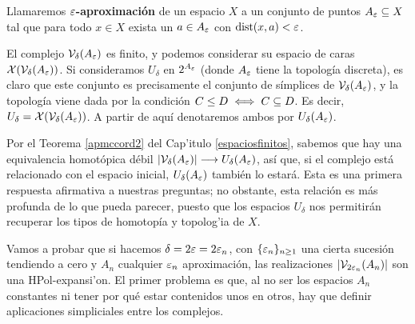 \begin{definition}
  Llamaremos $ \varepsilon $\textbf{-aproximación} de un espacio $ X  $ a un conjunto de puntos $ A_\varepsilon\subseteq X   $ tal que para todo $ x\in X  $ exista un $ a\in A_\varepsilon  $ con $ \operatorname{dist}(x,a)<\varepsilon  $.
\end{definition}

El complejo $ \mathcal{V}_\delta (A_\varepsilon ) $ es finito, y podemos considerar su espacio de caras $ \mathcal{X} (\mathcal{V}_\delta (A_\varepsilon )) $. Si consideramos $ U_{\delta} $ en $ 2^{A_\varepsilon} $ (donde $ A_\varepsilon  $ tiene la topología discreta), es claro que este conjunto es precisamente el conjunto de símplices de $ \mathcal{V}_\delta(A_\varepsilon ) $, y la topología viene dada por la condición $ C\leq D  \iff C\subseteq D$. Es decir, $ U_\delta = \mathcal{X} (\mathcal{V}_\delta (A_\varepsilon ))  $. A partir de aquí denotaremos ambos por $ U_\delta(A_\varepsilon ) $. 

Por el Teorema \ref{apmccord2} del Cap'itulo \ref{espaciosfinitos}, sabemos que hay una equivalencia homotópica débil $ \abs{\mathcal{V}_\delta (A_\varepsilon )} \longrightarrow U_\delta (A_\varepsilon ) $, así que, si el complejo está relacionado con el espacio inicial, $ U_\delta(A_\varepsilon ) $ también lo estará. Esta es una primera respuesta afirmativa a nuestras preguntas; no obstante, esta relación es más profunda de lo que pueda parecer, puesto que los espacios $ U_\delta  $ nos permitirán recuperar los tipos de homotopía y topolog'ia de $ X  $.

Vamos a probar que si hacemos $ \delta = 2\varepsilon   = 2\varepsilon_n  $, con $ \{\varepsilon_n\}_{n\geq 1} $ una cierta sucesión tendiendo a cero y $ A_n  $ cualquier $ \varepsilon_n  $ aproximación, las realizaciones $ \abs{\mathcal{V}_{2\varepsilon_n }(A_n ) } $ son una HPol-expansi'on. El primer problema es que, al no ser los espacios $ A_n  $ constantes ni tener por qué estar contenidos unos en otros, hay que definir aplicaciones simpliciales entre los complejos.

